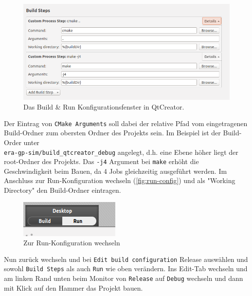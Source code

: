 \begin{figure}[h!]
	\centering
	\includegraphics[scale=0.5]{images/setup-qtcreator-buildrun-config.png}
	\caption{Das Build \& Run Konfigurationsfenster in QtCreator.}
  \label{fig:build-run}
\end{figure}

Der Eintrag von \texttt{CMake Arguments} soll dabei der relative Pfad vom
eingetragenen Build-Ordner zum obersten Ordner des Projekts sein. Im Beispiel
ist der Build-Order unter \\ \texttt{era-gp-sim/build\_qtcreator\_debug} angelegt,
d.h. eine Ebene höher liegt der root-Ordner des Projekts. Das \texttt{-j4}
Argument bei \texttt{make} erhöht die Geschwindigkeit beim Bauen, da 4 Jobs
gleichzeitig ausgeführt werden. Im Anschluss zur Run-Konfiguration wechseln
(\autoref{fig:run-config}) und als "Working Directory" den Build-Ordner
eintragen.

\begin{figure}[h!]
	\centering
	\includegraphics[trim={0 0.4cm 0.8cm 0}, clip]{images/setup-qtcreator-run-config}
	\caption{Zur Run-Konfiguration wechseln}
	\label{fig:run-config}
\end{figure}

Nun zurück wechseln und bei \texttt{Edit build configuration} Release auswählen
und sowohl \texttt{Build Steps} als auch \texttt{Run} wie oben verändern. Ins
Edit-Tab wechseln und am linken Rand unten beim Monitor von \texttt{Release} auf
\texttt{Debug} wechseln und dann mit Klick auf den Hammer das Projekt bauen.

